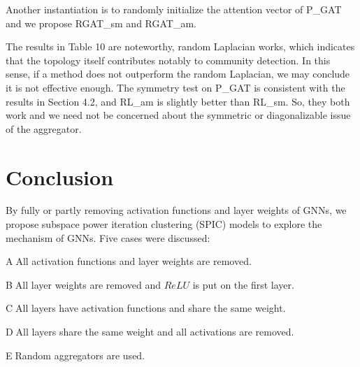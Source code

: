 \documentclass[preprint,11pt]{elsarticle}
\begin{document}
Another instantiation is to randomly initialize the attention vector of P\_GAT and we propose RGAT\_sm and RGAT\_am.
\begin{table}
\setlength{\abovecaptionskip}{0pt}
\setlength{\belowcaptionskip}{6pt}
  \caption{Test accuracy (\%) of random Laplacian models}
  \label{table-10}
  \centering
\end{table}

The results in Table 10 are noteworthy, random Laplacian works, which indicates that the topology itself contributes notably to community detection. In this sense, if a method does not outperform the random Laplacian, we may conclude it is not effective enough. The symmetry test on P\_GAT is consistent with the results in Section 4.2, and RL\_am is slightly better than RL\_sm. So, they both work and we need not be concerned about the symmetric or diagonalizable issue of the aggregator. 

\section{Conclusion}
By fully or partly removing activation functions and layer weights of GNNs, we propose subspace power iteration clustering (SPIC) models to explore the mechanism of GNNs. Five cases were discussed: 

 \textcircled{A}All activation functions and layer weights are removed.
 
 \textcircled{B}All layer weights are removed and $ReLU$ is put on the first layer.
 
 \textcircled{C}All layers have activation functions and share the same weight.
 
 \textcircled{D}All layers share the same weight and all activations are removed.
 
 \textcircled{E}Random aggregators are used.
\end{document}
